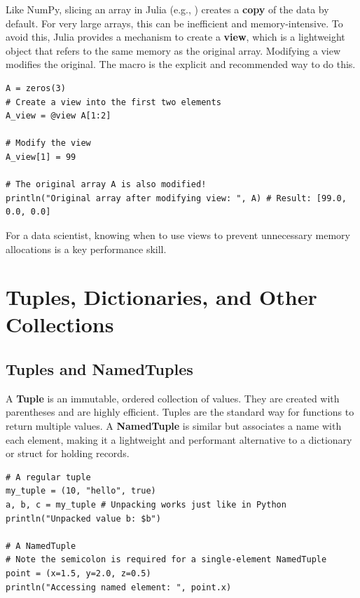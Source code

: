 \begin{remark}
Like NumPy, slicing an array in Julia (e.g., ) creates a \textbf{copy} of the data by default. For very large arrays, this can be inefficient and memory-intensive. To avoid this, Julia provides a mechanism to create a \textbf{view}, which is a lightweight object that refers to the same memory as the original array. Modifying a view modifies the original. The macro  is the explicit and recommended way to do this.

\begin{verbatim}
A = zeros(3)
# Create a view into the first two elements
A_view = @view A[1:2]

# Modify the view
A_view[1] = 99

# The original array A is also modified!
println("Original array after modifying view: ", A) # Result: [99.0, 0.0, 0.0]
\end{verbatim}
For a data scientist, knowing when to use views to prevent unnecessary memory allocations is a key performance skill.
\end{remark}

\section{Tuples, Dictionaries, and Other Collections}
\label{sec:julia_collections}

\subsection*{Tuples and NamedTuples}
A \textbf{Tuple} is an immutable, ordered collection of values. They are created with parentheses and are highly efficient. Tuples are the standard way for functions to return multiple values. A \textbf{NamedTuple} is similar but associates a name with each element, making it a lightweight and performant alternative to a dictionary or struct for holding records.

\text{ }\begin{verbatim}
# A regular tuple
my_tuple = (10, "hello", true)
a, b, c = my_tuple # Unpacking works just like in Python
println("Unpacked value b: $b")

# A NamedTuple
# Note the semicolon is required for a single-element NamedTuple
point = (x=1.5, y=2.0, z=0.5)
println("Accessing named element: ", point.x)
\end{verbatim}


